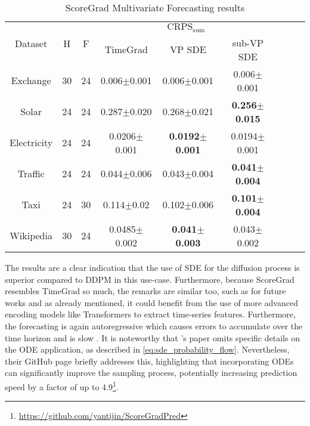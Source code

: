 \begin{table}[ht]
    \centering
    \begin{tabular}{ccccccccc}
        \toprule
        \multirow{2}{*}{Dataset} & \multirow{2}{*}{H} & \multirow{2}{*}{F} & \multicolumn{3}{c}{$\text{CRPS}_{\text{sum}}$} \\
        \cmidrule(lr){4-6} 
         & & & TimeGrad & VP SDE & sub-VP SDE \\
        \midrule
        Exchange & 30 & 24 & 0.006$\pm$0.001 & 0.006$\pm$0.001 & 0.006$\pm$0.001  \\
        \midrule
        Solar & 24 & 24 & 0.287$\pm$0.020 & 0.268$\pm$0.021 & \textbf{0.256$\pm$0.015} \\
        \midrule
        Electricity & 24 & 24 & 0.0206$\pm$0.001 & \textbf{0.0192$\pm$0.001} & 0.0194$\pm$0.001 \\
        \midrule
        Traffic & 24 & 24 & 0.044$\pm$0.006 & 0.043$\pm$0.004 & \textbf{0.041$\pm$0.004} \\
        \midrule
        Taxi & 24 & 30 & 0.114$\pm$0.02 & 0.102$\pm$0.006 & \textbf{0.101$\pm$0.004} \\
        \midrule
        Wikipedia & 30 & 24 & 0.0485$\pm$0.002 & \textbf{0.041$\pm$0.003} & 0.043$\pm$0.002 \\
        \bottomrule
    \end{tabular}
    \caption{ScoreGrad Multivariate Forecasting results \cite{yan_scoregrad_2021}}
    \label{tab:scoregrad-results}
\end{table}
The results are a clear indication that the use of SDE for the diffusion process is superior compared to DDPM in this use-case.
Furthermore, because ScoreGrad resembles TimeGrad so much, the remarks are similar too, such as for future works and as \textcite{yan_scoregrad_2021} already mentioned, it could benefit from the use of more advanced encoding models like Transformers \cite{vaswani_attention_2017} to extract time-series features. Furthermore, the forecasting is again autoregressive which causes errors to accumulate over the time horizon and is slow \cite{shen_non-autoregressive_2023}. It is noteworthy that \textcite{yan_scoregrad_2021}'s paper omits specific details on the ODE application, as described in \autoref{eq:sde_probability_flow}. Nevertheless, their GitHub page briefly addresses this, highlighting that incorporating ODEs can significantly improve the sampling process, potentially increasing prediction speed by a factor of up to 4.9\footnote{\url{https://github.com/yantijin/ScoreGradPred}}.